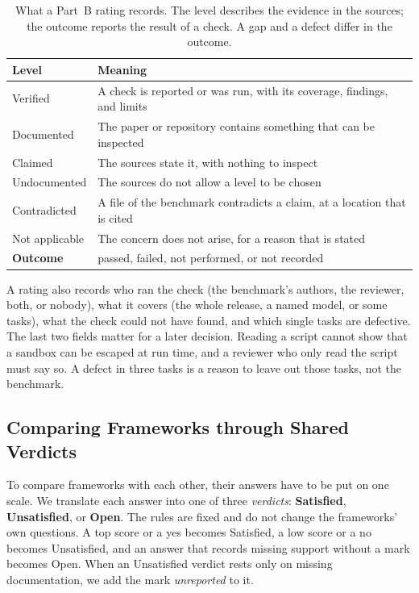 \documentclass[runningheads]{llncs}
\begin{document}
\begin{table}[t]
\caption{What a Part~B rating records. The level describes the evidence in the sources; the outcome reports the result of a check. A gap and a defect differ in the outcome.}
\label{tab:levels}
\centering
\footnotesize
\begin{tabularx}{\textwidth}{@{}>{\raggedright\arraybackslash}p{2.4cm}>{\raggedright\arraybackslash}X@{}}
\toprule
\textbf{Level} & \textbf{Meaning} \\
\midrule
Verified & A check is reported or was run, with its coverage, findings, and limits \\
Documented & The paper or repository contains something that can be inspected \\
Claimed & The sources state it, with nothing to inspect \\
Undocumented & The sources do not allow a level to be chosen \\
Contradicted & A file of the benchmark contradicts a claim, at a location that is cited \\
Not applicable & The concern does not arise, for a reason that is stated \\
\midrule
\textbf{Outcome} & passed, failed, not performed, or not recorded \\
\bottomrule
\end{tabularx}
\end{table}

A rating also records who ran the check (the benchmark's authors, the reviewer, both, or nobody), what it covers (the whole release, a named model, or some tasks), what the check could not have found, and which single tasks are defective. The last two fields matter for a later decision. Reading a script cannot show that a sandbox can be escaped at run time, and a reviewer who only read the script must say so. A defect in three tasks is a reason to leave out those tasks, not the benchmark.

\subsection{Comparing Frameworks through Shared Verdicts}
To compare frameworks with each other, their answers have to be put on one scale. We translate each answer into one of three \emph{verdicts}: \textbf{Satisfied}, \textbf{Unsatisfied}, or \textbf{Open}. The rules are fixed and do not change the frameworks' own questions. A top score or a yes becomes Satisfied, a low score or a no becomes Unsatisfied, and an answer that records missing support without a mark becomes Open. When an Unsatisfied verdict rests only on missing documentation, we add the mark \emph{unreported} to it.
\end{document}
